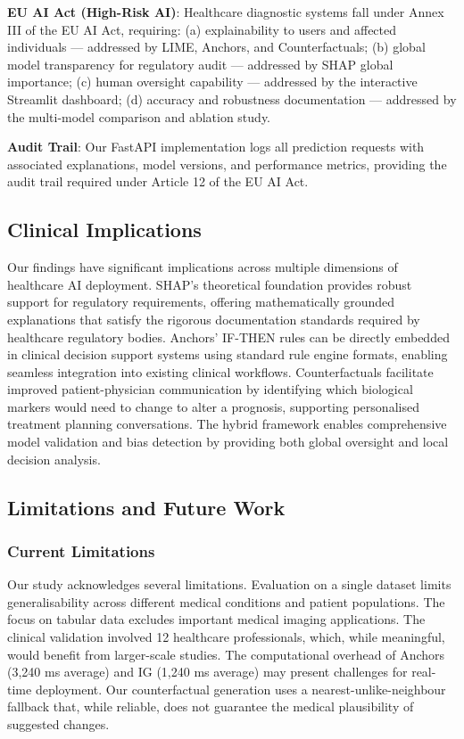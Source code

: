 \documentclass[journal]{IEEEtran}
\begin{document}
\textbf{EU AI Act (High-Risk AI)}: Healthcare diagnostic systems fall under Annex III of the EU AI Act, requiring: (a) explainability to users and affected individuals — addressed by LIME, Anchors, and Counterfactuals; (b) global model transparency for regulatory audit — addressed by SHAP global importance; (c) human oversight capability — addressed by the interactive Streamlit dashboard; (d) accuracy and robustness documentation — addressed by the multi-model comparison and ablation study.

\textbf{Audit Trail}: Our FastAPI implementation logs all prediction requests with associated explanations, model versions, and performance metrics, providing the audit trail required under Article 12 of the EU AI Act.

\subsection{Clinical Implications}

Our findings have significant implications across multiple dimensions of healthcare AI deployment. SHAP's theoretical foundation provides robust support for regulatory requirements, offering mathematically grounded explanations that satisfy the rigorous documentation standards required by healthcare regulatory bodies. Anchors' IF-THEN rules can be directly embedded in clinical decision support systems using standard rule engine formats, enabling seamless integration into existing clinical workflows. Counterfactuals facilitate improved patient-physician communication by identifying which biological markers would need to change to alter a prognosis, supporting personalised treatment planning conversations. The hybrid framework enables comprehensive model validation and bias detection by providing both global oversight and local decision analysis.

\subsection{Limitations and Future Work}

\subsubsection{Current Limitations}

Our study acknowledges several limitations. Evaluation on a single dataset limits generalisability across different medical conditions and patient populations. The focus on tabular data excludes important medical imaging applications. The clinical validation involved 12 healthcare professionals, which, while meaningful, would benefit from larger-scale studies. The computational overhead of Anchors (3,240 ms average) and IG (1,240 ms average) may present challenges for real-time deployment. Our counterfactual generation uses a nearest-unlike-neighbour fallback that, while reliable, does not guarantee the medical plausibility of suggested changes.
\end{document}
